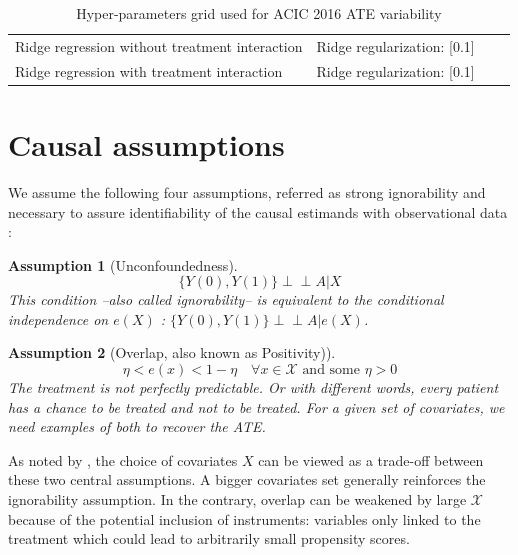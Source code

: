 \documentclass{report}
\newcommand{\indep}{\perp \!\!\! \perp}
\newtheorem{assumption}{Assumption}
\begin{document}
\begin{appendices}
\begin{table}[h!]
{\begin{tabular}{llll}
        Ridge regression without treatment interaction & Ridge regularization:
        [0.1]                                                                  \\

        Ridge regression with treatment interaction    & Ridge regularization:
        [0.1]                                                                  \\
        \bottomrule
      \end{tabular}
    }
    \caption{Hyper-parameters grid used for ACIC 2016 ATE variability}
    \label{apd:toy_example:acic_2016_ate_variability:table}
  \end{table}


  \section{Causal assumptions}\label{apd:causal_assumptions}

  We assume the following four assumptions, referred as strong ignorability and
  necessary to assure identifiability of the causal estimands with observational
  data \citep{rubin_causal_2005}:
  \begin{assumption}[Unconfoundedness]\label{assumption:ignorability}
    \begin{equation*}\label{eq:ignorability}
      \{Y(0), Y(1) \} \indep A | X
    \end{equation*}
    This condition --also called ignorability-- is equivalent to the conditional
    independence on $e(X)$ \citep{rosenbaum_central_1983}: $\{Y(0), Y(1) \}
      \indep  A | e(X)$.
  \end{assumption}


  \begin{assumption}[Overlap, also known as Positivity)]\label{assumption:overlap}
    \begin{equation*}\label{eq:overlap}
      \eta < e(x) < 1 - \eta \quad \forall x \in \mathcal X \text{ and some } \eta > 0
    \end{equation*}
    The treatment is not perfectly predictable. Or with different words, every
    patient has a chance to be treated and not to be treated. For a given set of
    covariates, we need examples of both to recover the ATE.
  \end{assumption}

  As noted by \cite{damour_overlap_2020}, the choice of covariates $X$ can
  be viewed as a trade-off between these two central assumptions. A bigger
  covariates set generally reinforces the ignorability assumption. In the
  contrary, overlap can be weakened by large $\mathcal{X}$ because of the
  potential inclusion of instruments: variables only linked to the treatment which
  could lead to arbitrarily small propensity scores.


\end{appendices}
\end{document}
